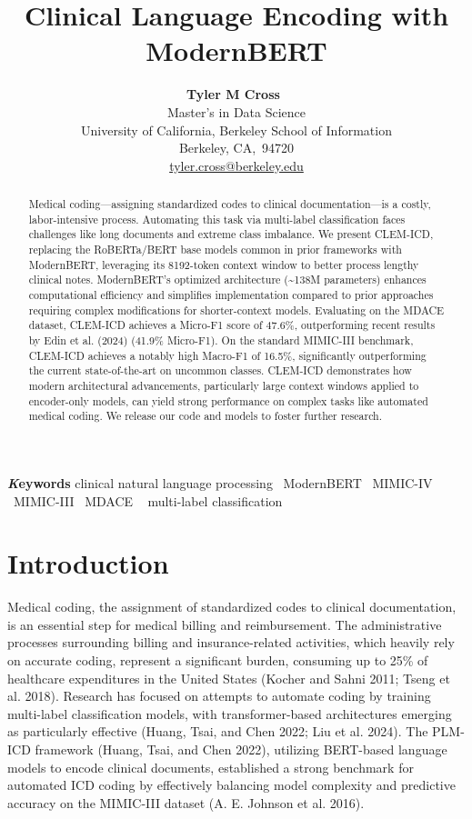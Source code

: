 \documentclass[
]{article}
\title{Clinical Language Encoding with ModernBERT}
\author{\textbf{Tyler M Cross}~\orcidlink{0009-0003-3529-8222}\\Master's
in Data Science\\University of California, Berkeley School of
Information\\Berkeley,
CA,\ 94720\\\href{mailto:tyler.cross@berkeley.edu}{tyler.cross@berkeley.edu}}
\date{}
\begin{document}
\maketitle
\begin{abstract}
Medical coding---assigning standardized codes to clinical
documentation---is a costly, labor-intensive process. Automating this
task via multi-label classification faces challenges like long documents
and extreme class imbalance. We present CLEM-ICD, replacing the
RoBERTa/BERT base models common in prior frameworks with ModernBERT,
leveraging its 8192-token context window to better process lengthy
clinical notes. ModernBERT's optimized architecture (\textasciitilde138M
parameters) enhances computational efficiency and simplifies
implementation compared to prior approaches requiring complex
modifications for shorter-context models. Evaluating on the MDACE
dataset, CLEM-ICD achieves a Micro-F1 score of 47.6\%, outperforming
recent results by Edin et al. (2024) (41.9\% Micro-F1). On the standard
MIMIC-III benchmark, CLEM-ICD achieves a notably high Macro-F1 of
16.5\%, significantly outperforming the current state-of-the-art on
uncommon classes. CLEM-ICD demonstrates how modern architectural
advancements, particularly large context windows applied to encoder-only
models, can yield strong performance on complex tasks like automated
medical coding. We release our code and models to foster further
research.
\end{abstract}
{\bfseries \emph Keywords}
\def\sep{\textbullet\ }
clinical natural language
processing \sep ModernBERT \sep MIMIC-IV \sep MIMIC-III \sep MDACE \sep 
multi-label classification



\section{Introduction}\label{sec-intro}

Medical coding, the assignment of standardized codes to clinical
documentation, is an essential step for medical billing and
reimbursement. The administrative processes surrounding billing and
insurance-related activities, which heavily rely on accurate coding,
represent a significant burden, consuming up to 25\% of healthcare
expenditures in the United States (Kocher and Sahni 2011; Tseng et al.
2018). Research has focused on attempts to automate coding by training
multi-label classification models, with transformer-based architectures
emerging as particularly effective (Huang, Tsai, and Chen 2022; Liu et
al. 2024). The PLM-ICD framework (Huang, Tsai, and Chen 2022), utilizing
BERT-based language models to encode clinical documents, established a
strong benchmark for automated ICD coding by effectively balancing model
complexity and predictive accuracy on the MIMIC-III dataset (A. E.
Johnson et al. 2016).
\end{document}
